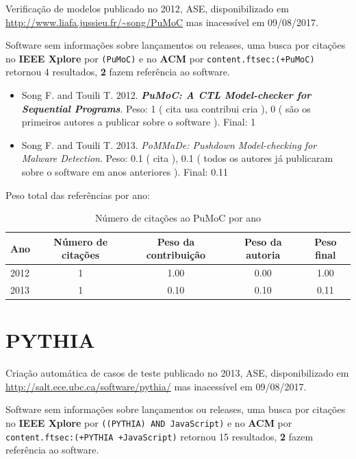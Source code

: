 Verificação de modelos
publicado no 2012, ASE,
disponibilizado em \url{http://www.liafa.jussieu.fr/~song/PuMoC}
mas inacessível em 09/08/2017.

Software sem informações sobre lançamentos ou releases,
uma busca por citações no {\bf IEEE Xplore} por
\texttt{(PuMoC)}
e no {\bf ACM} por
\texttt{content.ftsec:(+PuMoC)}
retornou
4 resultados,
{\bf 2} fazem referência ao software.

\begin{itemize}
\item Song F. and Touili T.
      2012.
        \textbf{\textit{ PuMoC: A CTL Model-checker for Sequential Programs}}.
      Peso:
      1 (
          cita
          usa
          contribui
          cria
      ),
      0 (
são os primeiros autores a publicar sobre o software
      ).
      Final:
      1

\item Song F. and Touili T.
      2013.
        \textit{ PoMMaDe: Pushdown Model-checking for Malware Detection}.
      Peso:
      0.1 (
          cita
      ),
      0.1 (
todos os autores já publicaram sobre o software em anos anteriores
      ).
      Final:
      0.11

\end{itemize}

Peso total das referências por ano:

\begin{table}[h]
\caption{Número de citações ao PuMoC por ano}
\centering
\begin{tabular}{| l | c | c | c | c |}
  \hline
  Ano & Número de citações & Peso da contribuição & Peso da autoria & Peso final \\
  \hline
  2012
    & 1
    & 1.00
    & 0.00
    & 1.00 \\
  2013
    & 1
    & 0.10
    & 0.10
    & 0.11 \\
  \hline
\end{tabular}
\end{table}


\section{PYTHIA}

Criação automática de casos de teste
publicado no 2013, ASE,
disponibilizado em \url{http://salt.ece.ubc.ca/software/pythia/}
mas inacessível em 09/08/2017.

Software sem informações sobre lançamentos ou releases,
uma busca por citações no {\bf IEEE Xplore} por
\texttt{((PYTHIA) AND JavaScript)}
e no {\bf ACM} por
\texttt{content.ftsec:(+PYTHIA +JavaScript)}
retornou
15 resultados,
{\bf 2} fazem referência ao software.

